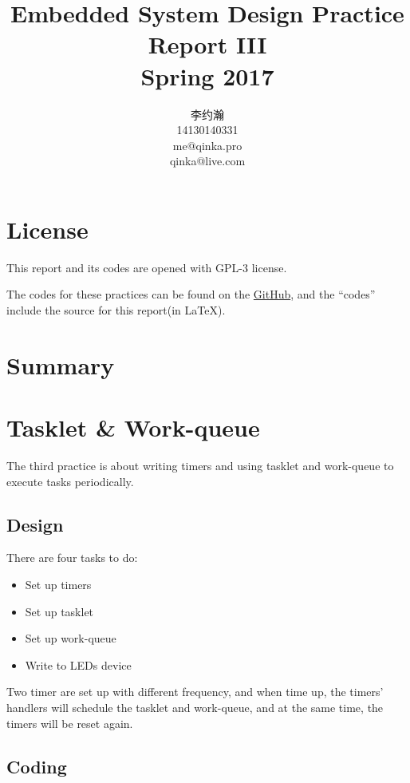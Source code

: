\documentclass{report}
\title{Embedded System Design Practice Report III \\ Spring 2017}
\author{李约瀚 \\ 14130140331 \\ me@qinka.pro \\ qinka@live.com}
\begin{document}
    \maketitle
    \tableofcontents
    
    \chapter{License}
    \label{chap:license}
    This report and its codes are opened with GPL-3 license.
    
    The codes for these practices can be found on the%
    \href{https://github.com/Qinka/embedded-system-design-homework}{GitHub},
    and the ``codes'' include the source for this report(in \LaTeX).
    
    \chapter{Summary}
    \label{chap:summary}
    
    \chapter{Tasklet \& Work-queue}
    \label{chap:tnw}
    
    The third practice is about writing timers and using tasklet and work-queue to
    execute tasks periodically.
    
    \section{Design}
    \label{chap:tnw:design}
    
    There are four tasks to do:
    \begin{itemize}
        \item Set up timers
        \item Set up tasklet
        \item Set up work-queue
        \item Write to LEDs device
    \end{itemize}

    Two timer are set up with different frequency, and when time up, the timers'
    handlers will schedule the tasklet and work-queue, and at the same time,
    the timers will be reset again.
    
    \section{Coding}
    \label{chap:tnw:coding}
    
\end{document}
